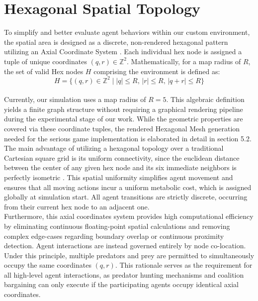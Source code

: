 \documentclass[12pt,a4paper]{report}
\begin{document}
	\section{Hexagonal Spatial Topology}
	
	To simplify and better evaluate agent behaviors within our custom environment, the spatial area is designed as a discrete, non-rendered hexagonal pattern utilizing an Axial Coordinate System \cite{Patel2016}. Each individual hex node is assigned a tuple of unique coordinates $(q, r) \in \mathbb{Z}^2$. Mathematically, for a map radius of $R$, the set of valid Hex nodes $H$ comprising the environment is defined as: \\
	
	\[H = \{ (q, r) \in \mathbb{Z}^2 \mid |q| \le R, \, |r| \le R, \, |q + r| \le R \} \] \\
	
	Currently, our simulation uses a map radius of $R = 5$. This algebraic definition yields a finite graph structure without requiring a graphical rendering pipeline during the experimental stage of our work. While the geometric properties are covered via these coordinate tuples, the rendered Hexagonal Mesh generation needed for the serious game implementation is elaborated in detail in section 5.2. \\
	
	The main advantage of utilizing a hexagonal topology over a traditional Cartesian square grid is its uniform connectivity, since the euclidean distance between the center of any given hex node and its six immediate neighbors is perfectly isometric \cite{Patel2016}. This spatial uniformity simplifies agent movement and ensures that all moving actions incur a uniform metabolic cost, which is assigned globally at simulation start. All agent transitions are strictly discrete, occurring from their current hex node to an adjacent one. \\
	
	Furthermore, this axial coordinates system provides high computational efficiency by eliminating continuous floating-point spatial calculations and removing complex edge-cases regarding boundary overlap or continuous proximity detection. Agent interactions are instead governed entirely by node co-location. Under this principle, multiple predators and prey are permitted to simultaneously occupy the same coordinates $(q, r)$. This rationale serves as the requirement for all high-level agent interactions, as predator hunting mechanisms and coalition bargaining can only execute if the participating agents occupy identical axial coordinates. \\
	
\end{document}
